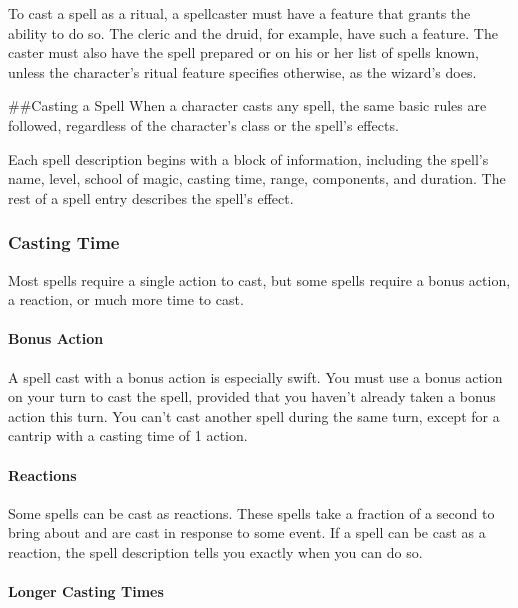\documentclass[
]{article}
\begin{document}
To cast a spell as a ritual, a spellcaster must have a feature that
grants the ability to do so. The cleric and the druid, for example, have
such a feature. The caster must also have the spell prepared or on his
or her list of spells known, unless the character's ritual feature
specifies otherwise, as the wizard's does.

\#\#Casting a Spell When a character casts any spell, the same basic
rules are followed, regardless of the character's class or the spell's
effects.

Each spell description begins with a block of information, including the
spell's name, level, school of magic, casting time, range, components,
and duration. The rest of a spell entry describes the spell's effect.

\hypertarget{casting-time}{%
\subsubsection{Casting Time}\label{casting-time}}

Most spells require a single action to cast, but some spells require a
bonus action, a reaction, or much more time to cast.

\hypertarget{bonus-action}{%
\paragraph{Bonus Action}\label{bonus-action}}

A spell cast with a bonus action is especially swift. You must use a
bonus action on your turn to cast the spell, provided that you haven't
already taken a bonus action this turn. You can't cast another spell
during the same turn, except for a cantrip with a casting time of 1
action.

\hypertarget{reactions}{%
\paragraph{Reactions}\label{reactions}}

Some spells can be cast as reactions. These spells take a fraction of a
second to bring about and are cast in response to some event. If a spell
can be cast as a reaction, the spell description tells you exactly when
you can do so.

\hypertarget{longer-casting-times}{%
\paragraph{Longer Casting Times}\label{longer-casting-times}}
\end{document}
